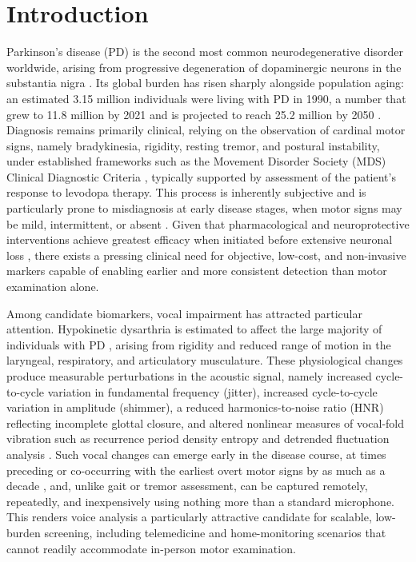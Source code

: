 \section{Introduction}
\label{sec:1}

Parkinson's disease (PD) is the second most common neurodegenerative disorder worldwide, arising from progressive degeneration of dopaminergic neurons in the substantia nigra \cite{Kalia:2015}. Its global burden has risen sharply alongside population aging: an estimated 3.15 million individuals were living with PD in 1990, a number that grew to 11.8 million by 2021 and is projected to reach 25.2 million by 2050 \cite{GBD2016PDCollaborators:2018, Luo:2025}. Diagnosis remains primarily clinical, relying on the observation of cardinal motor signs, namely bradykinesia, rigidity, resting tremor, and postural instability, under established frameworks such as the Movement Disorder Society (MDS) Clinical Diagnostic Criteria \cite{Postuma:2015}, typically supported by assessment of the patient's response to levodopa therapy. This process is inherently subjective and is particularly prone to misdiagnosis at early disease stages, when motor signs may be mild, intermittent, or absent \cite{Rizzo:2016}. Given that pharmacological and neuroprotective interventions achieve greatest efficacy when initiated before extensive neuronal loss \cite{Frequin:2024}, there exists a pressing clinical need for objective, low-cost, and non-invasive markers capable of enabling earlier and more consistent detection than motor examination alone.

Among candidate biomarkers, vocal impairment has attracted particular attention. Hypokinetic dysarthria is estimated to affect the large majority of individuals with PD \cite{Ho:1999, Cao:2025}, arising from rigidity and reduced range of motion in the laryngeal, respiratory, and articulatory musculature. These physiological changes produce measurable perturbations in the acoustic signal, namely increased cycle-to-cycle variation in fundamental frequency (jitter), increased cycle-to-cycle variation in amplitude (shimmer), a reduced harmonics-to-noise ratio (HNR) reflecting incomplete glottal closure, and altered nonlinear measures of vocal-fold vibration such as recurrence period density entropy and detrended fluctuation analysis \cite{Yang:2020}. Such vocal changes can emerge early in the disease course, at times preceding or co-occurring with the earliest overt motor signs by as much as a decade \cite{Cao:2025}, and, unlike gait or tremor assessment, can be captured remotely, repeatedly, and inexpensively using nothing more than a standard microphone. This renders voice analysis a particularly attractive candidate for scalable, low-burden screening, including telemedicine and home-monitoring scenarios that cannot readily accommodate in-person motor examination.

